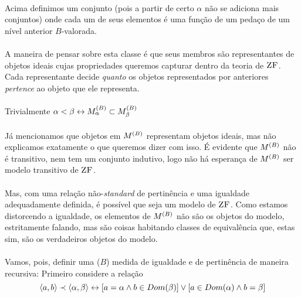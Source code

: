     \paragraph{}
        Acima definimos um conjunto (pois a partir 
        de certo $\alpha$ não se adiciona mais 
        conjuntos) onde cada um de seus elementos 
        é uma função de um pedaço de um nível 
        anterior $B$-valorada.
    \paragraph{}
        A maneira de pensar sobre esta classe
        é que seus membros são representantes 
        de objetos ideais cujas propriedades 
        queremos capturar dentro da teoria de $\text{\sc ZF}$. 
        Cada representante decide 
        \textit{quanto} os objetos representados 
        por anteriores \textit{pertence}
        ao objeto que ele representa.
    \paragraph{}
        Trivialmente $\alpha<\beta\leftrightarrow M^{(B)}_\alpha\subset M^{(B)}_\beta$
    \paragraph{}
        Já mencionamos que objetos em $M^{(B)}$ 
        representam objetos ideais, mas não 
        explicamos exatamente o que queremos 
        dizer com isso. É evidente que $M^{(B)}$
        não é transitivo, nem tem um conjunto 
        indutivo, logo não há esperança de 
        $M^{(B)}$ ser modelo transitivo de $\text{\sc ZF}$.
    \paragraph{}
        Mas, com uma relação não-\textit{standard}
        de pertinência e uma igualdade 
        adequadamente definida, é possível que 
        seja um modelo de $\text{\sc ZF}$. Como estamos 
        distorcendo a igualdade, os elementos de 
        $M^{(B)}$ não são os objetos do modelo, 
        estritamente falando, mas são coisas 
        habitando classes de equivalência que, 
        estas sim, são os verdadeiros objetos 
        do modelo.
    \paragraph{}
        Vamos, pois, definir uma ($B$) medida 
        de igualdade e de pertinência de maneira 
        recursiva: Primeiro considere a relação
    $$ \TUPLE{a}{b} \prec \TUPLE{\alpha}{\beta} \bim [a = \alpha \land b\in Dom(\beta)] \lor [a\in Dom(\alpha) \land b = \beta] $$
